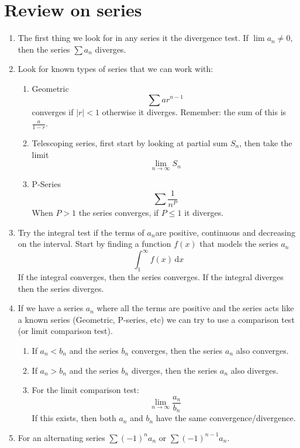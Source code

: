 \documentclass{report}
\begin{document}
\section{Review on series}
    \begin{enumerate}
        \item The first thing we look for in any series it the divergence test. If \(\lim a_n \neq 0\), then the series \(\sum a_n\) diverges.
        \item Look for known types of series that we can work with:
        \begin{enumerate}
            \item Geometric \[\sum ar^{n-1}\]
            converges if \(|r| < 1\) otherwise it diverges. Remember: the sum of this is \(\frac{a}{1-r}\).
            \item Telescoping series, first start by looking at partial sum \(S_n\), then take the limit
            \[\lim_{n \to \infty} S_n\]
            \item P-Series \[\sum \frac{1}{n^P}\]
            When \(P > 1\) the series converges, if \(P \leq 1\) it diverges.
        \end{enumerate}
        \item Try the integral test if the terms of \(a_n\)are positive, continuous and decreasing on the interval.
        Start by finding a function \(f(x)\) that models the series \(a_n\)
        \[\int_{1}^{\infty} f(x) \,\mathrm{d}x \]
        If the integral converges, then the series converges. If the integral diverges then the series diverges.
        \item If we have a series \(a_n\) where all the terms are positive and the series acts like a known series (Geometric, P-series, etc)
        we can try to use a comparison test (or limit comparison test).
        \begin{enumerate}
            \item If \(a_n < b_n\) and the series \(b_n\) converges, then the series \(a_n\) also converges.
            \item If \(a_n > b_n\) and the series \(b_n\) diverges, then the series \(a_n\) also diverges.
            \item For the limit comparison test:
            \[\lim_{n \to \infty} \frac{a_n}{b_n}\]
            If this exists, then both \(a_n\) and \(b_n\) have the same convergence/divergence.
        \end{enumerate}
        \item For an alternating series \(\sum (-1)^n a_n\) or \(\sum (-1)^{n-1} a_n\).

\end{enumerate}
\end{document}

